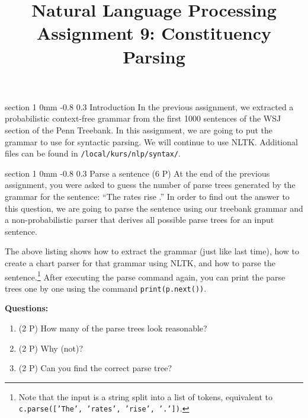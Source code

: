 \documentclass[11pt]{article}
\title{{\LARGE Natural Language Processing}\\[1.5mm]{\large Assignment 9: Constituency Parsing}}
\author{}
\date{} %
\makeatletter
\newcommand{\newsec}[2]{\section{#1}\label{sec:#2}\noindent}
\renewcommand{\section}{\@startsection
{section}%
{1}%
{0mm}%
{-0.8\baselineskip}%
{0.3\baselineskip}%
{\bfseries\large}}%
\makeatother
\begin{document}
 

\maketitle
\vspace{-2mm}
\newsec{Introduction}{intro}%
In the previous assignment, we extracted a probabilistic context-free grammar from the first 1000 sentences of the WSJ section of the Penn Treebank.
In this assignment, we are going to put the grammar to use for syntactic parsing. We will continue to use NLTK. 
Additional files can be found in {\tt /local/kurs/nlp/syntax/}.

\newsec{Parse a sentence (6 P)}{chart}%
At the end of the previous assignment, you were asked to guess the number of parse trees generated by the grammar for the sentence: ``The rates rise .'' 
In order to find out the answer to this question, we are going to parse the sentence using our treebank grammar and a non-probabilistic parser that derives
all possible parse trees for an input sentence.
\begin{center}
\fbox{

}
\end{center}
The above listing shows how to extract the grammar (just like last time), how to create a chart parser for that grammar using NLTK,
and how to parse the sentence.\footnote{Note that the input is a string split into a list of tokens, equivalent to {\tt c.parse(['The', 'rates', 'rise', '.'])}.} 
After executing the parse command again, you can print the parse trees one by one using the command {\tt print(p.next())}.
\begin{center}
\fbox{

}
\end{center}
{\bf Questions:} 
\begin{enumerate}[noitemsep,topsep=0.2cm]
\item (2 P) How many of the parse trees look reasonable?
\item (2 P) Why (not)?
\item (2 P) Can you find the correct parse tree?
\end{enumerate}
\end{document}

